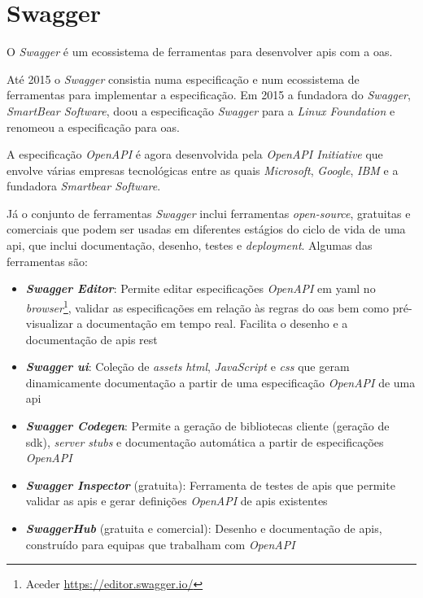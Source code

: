 \section{Swagger}
O \textit{Swagger} é um ecossistema de ferramentas para desenvolver \acrshort{api}s com a \acrfull{oas}.

Até 2015 o \textit{Swagger} consistia numa especificação e num ecossistema de ferramentas para implementar a especificação. Em 2015 a fundadora do \textit{Swagger}, \textit{SmartBear Software}, doou a especificação \textit{Swagger} para a \textit{Linux Foundation} e renomeou a especificação para \acrlong{oas}.~\cite{wiswagger}

A especificação \textit{OpenAPI} é agora desenvolvida pela \textit{OpenAPI Initiative} que envolve várias empresas tecnológicas entre as quais \textit{Microsoft}, \textit{Google}, \textit{IBM} e a fundadora \textit{Smartbear Software}.

Já o conjunto de ferramentas \textit{Swagger} inclui ferramentas \textit{open-source}, gratuitas e comerciais que podem ser usadas em diferentes estágios do ciclo de vida de uma \acrshort{api}, que inclui documentação, desenho, testes e \textit{deployment}. Algumas das ferramentas são:~\cite{swaggerVSoas}
\begin{itemize}
    \item \textbf{\textit{Swagger Editor}}: Permite editar especificações \textit{OpenAPI} em \acrshort{yaml} no \textit{browser}\footnote{Aceder \url{https://editor.swagger.io/}}, validar as especificações em relação às regras do \acrshort{oas} bem como pré-visualizar a documentação em tempo real. Facilita o desenho e a documentação de \acrshort{api}s \acrshort{rest}
    \item \textbf{\textit{Swagger \acrshort{ui}}}: Coleção de \textit{assets} \textit{\acrshort{html}}, \textit{JavaScript} e \textit{\acrshort{css}} que geram dinamicamente documentação a partir de uma especificação \textit{OpenAPI} de uma \acrshort{api}
    \item \textbf{\textit{Swagger Codegen}}: Permite a geração de bibliotecas cliente (geração de \acrshort{sdk}), \textit{server stubs} e documentação automática a partir de especificações \textit{OpenAPI}
    \item \textbf{\textit{Swagger Inspector}} (gratuita): Ferramenta de testes de \acrshort{api}s que permite validar as \acrshort{api}s e gerar definições \textit{OpenAPI} de \acrshort{api}s existentes
    \item \textbf{\textit{SwaggerHub}} (gratuita e comercial): Desenho e documentação de \acrshort{api}s, construído para equipas que trabalham com \textit{OpenAPI}
\end{itemize}

